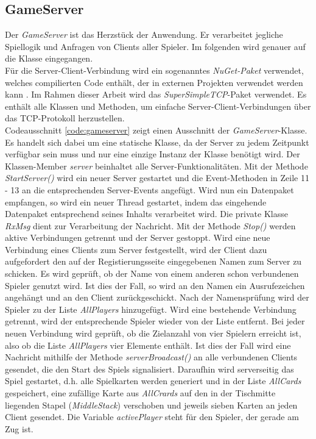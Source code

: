 \subsection{GameServer}
Der \textit{GameServer} ist das Herzstück der Anwendung. Er verarbeitet jegliche Spiellogik und Anfragen von Clients aller Spieler. Im folgenden wird genauer auf die Klasse eingegangen.\\
Für die Server-Client-Verbindung wird ein sogenanntes \textit{NuGet-Paket} verwendet, welches compilierten Code enthält, der in externen Projekten verwendet werden kann 
\cite{Nuget}. 
Im Rahmen dieser Arbeit wird das \textit{SuperSimpleTCP}-Paket verwendet. Es enthält alle Klassen und Methoden, um einfache Server-Client-Verbindungen über das TCP-Protokoll herzustellen.\\
Codeausschnitt \ref{code:gameserver} zeigt einen Ausschnitt der \textit{GameServer}-Klasse. Es handelt sich dabei um eine statische Klasse, da der Server zu jedem Zeitpunkt verfügbar sein muss und nur eine einzige Instanz der Klasse benötigt wird. Der Klassen-Member \textit{server} beinhaltet alle Server-Funktionalitäten. Mit der Methode \textit{StartServer()} wird ein neuer Server gestartet und die Event-Methoden in Zeile 11 - 13 an die entsprechenden Server-Events angefügt. Wird nun ein Datenpaket empfangen, so wird ein neuer Thread gestartet, indem das eingehende Datenpaket entsprechend seines Inhalts verarbeitet wird. Die private Klasse \textit{RxMsg} dient zur Verarbeitung der Nachricht. Mit der Methode \textit{Stop()} werden aktive Verbindungen getrennt und der Server gestoppt. Wird eine neue Verbindung eines Clients zum Server festgestellt, wird der Client dazu aufgefordert den auf der Registierungsseite eingegebenen Namen zum Server zu schicken. Es wird geprüft, ob der Name von einem anderen schon verbundenen Spieler genutzt wird. Ist dies der Fall, so wird an den Namen ein Ausrufezeichen angehängt und an den Client zurückgeschickt. Nach der Namensprüfung wird der Spieler zu der Liste \textit{AllPlayers} hinzugefügt. Wird eine bestehende Verbindung getrennt, wird der entsprechende Spieler wieder von der Liste entfernt. Bei jeder neuen Verbindung wird geprüft, ob die Zielanzahl von vier Spielern erreicht ist, also ob die Liste \textit{AllPlayers} vier Elemente enthält. Ist dies der Fall wird eine Nachricht mithilfe der Methode \textit{serverBroadcast()} an alle verbundenen Clients gesendet, die den Start des Spiels signalisiert. Daraufhin wird serverseitig das Spiel gestartet, d.h. alle Spielkarten werden generiert und in der Liste \textit{AllCards} gespeichert, eine zufällige Karte aus \textit{AllCrards} auf den in der Tischmitte liegenden Stapel (\textit{MiddleStack}) verschoben und jeweils sieben Karten an jeden Client gesendet. Die Variable \textit{activePlayer} steht für den Spieler, der gerade am Zug ist.
